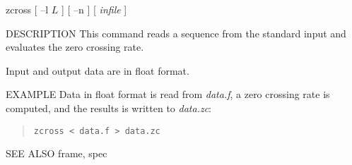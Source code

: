 % 
% 
% 
% 
%                                                                        
%

\begin{synopsis}
\item[zcross] [ --l $L$ ] [ --n ] [ {\em infile} ]
\end{synopsis}

\begin{qsection}{DESCRIPTION}
This command reads a sequence from the standard input
and evaluates the zero crossing rate.
\par
Input and output data are in float format.
\end{qsection}

\begin{options}
\end{options}

\begin{qsection}{EXAMPLE}
Data in float format is read from {\em data.f},
a zero crossing rate is computed,
and the results is written to {\em data.zc}:
\begin{quote}
  \verb!zcross < data.f > data.zc!
\end{quote}
\end{qsection}

\begin{qsection}{SEE ALSO}
  frame, spec
\end{qsection}
